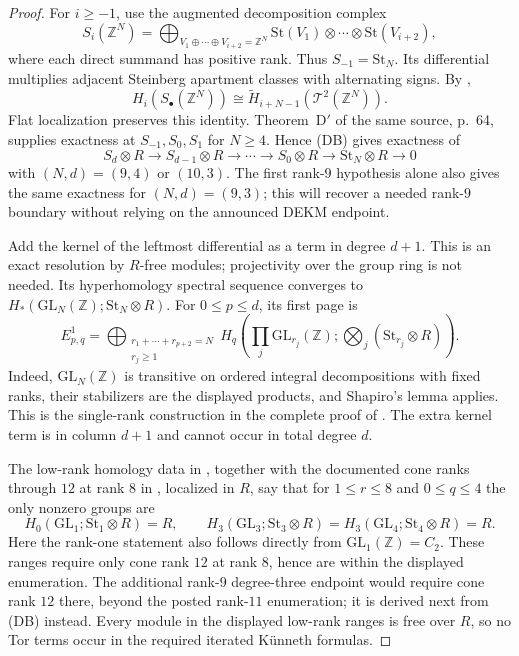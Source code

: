 \documentclass[11pt,a4paper]{article}
\theoremstyle{definition}
\begin{document}
\begin{proof}
For $i\ge-1$, use the augmented decomposition complex
\[
 S_i(\mathbb Z^N)=
 \bigoplus_{V_1\oplus\cdots\oplus V_{i+2}=\mathbb Z^N}
       \mathrm{St}(V_1)\otimes\cdots\otimes\mathrm{St}(V_{i+2}),
\]
where each direct summand has positive rank. Thus $S_{-1}=\mathrm{St}_N$.
Its differential multiplies adjacent Steinberg apartment classes with
alternating signs. By \cite[Theorem~23.3, p.~49]{MillerPatztPutman2025},
\[
 H_i(S_\bullet(\mathbb Z^N))
   \cong\widetilde H_{i+N-1}(\mathcal T^2(\mathbb Z^N)).
\]
Flat localization preserves this identity.
Theorem~D$'$ of the same source, p.~64, supplies exactness at
$S_{-1},S_0,S_1$ for $N\ge4$. Hence \textup{(DB)} gives exactness
of
\[
 S_d\otimes R\longrightarrow S_{d-1}\otimes R\longrightarrow\cdots
 \longrightarrow S_0\otimes R\longrightarrow\mathrm{St}_N\otimes R
 \longrightarrow0
\]
with $(N,d)=(9,4)$ or $(10,3)$.
The first rank-$9$ hypothesis alone also gives the same exactness
for $(N,d)=(9,3)$; this will recover a needed rank-$9$ boundary
without relying on the announced DEKM endpoint.

Add the kernel of the leftmost differential as a term in degree
$d+1$. This is an exact resolution by $R$-free modules; projectivity
over the group ring is not needed. Its hyperhomology spectral sequence
converges to $H_*(\mathrm{GL}_N(\mathbb Z);\mathrm{St}_N\otimes R)$.
For $0\le p\le d$, its first page is
\[
 E^1_{p,q}=
 \bigoplus_{\substack{r_1+\cdots+r_{p+2}=N\\r_j\ge1}}
 H_q\left(\prod_j\mathrm{GL}_{r_j}(\mathbb Z);
                   \bigotimes_j(\mathrm{St}_{r_j}\otimes R)\right).
                                                               \tag{DB1}
\]
Indeed, $\mathrm{GL}_N(\mathbb Z)$ is transitive on ordered integral
decompositions with fixed ranks, their stabilizers are the displayed
products, and Shapiro's lemma applies. This is the single-rank
construction in the complete proof of
\cite[Lemma~23.5, pp.~50--51]{MillerPatztPutman2025}.
The extra kernel term is in column $d+1$ and cannot occur in total
degree $d$.

The low-rank homology data in
\cite[Theorems~4.3 and~8.1]{ElbazGanglSoule2013}, together with
the documented cone ranks through $12$ at rank $8$ in
\cite[Proposition~1.5, Tables~3--5]{DEKM2026}, localized in $R$, say
that for $1\le r\le8$ and $0\le q\le4$ the only nonzero groups
are
\[
 H_0(\mathrm{GL}_1;\mathrm{St}_1\otimes R)=R,
 \qquad
 H_3(\mathrm{GL}_3;\mathrm{St}_3\otimes R)=
 H_3(\mathrm{GL}_4;\mathrm{St}_4\otimes R)=R.
\]
Here the rank-one statement also follows directly from
$\mathrm{GL}_1(\mathbb Z)=C_2$. These ranges require only cone
rank $12$ at rank $8$, hence are within the displayed enumeration.
The additional rank-$9$ degree-three endpoint would require cone
rank $12$ there, beyond the posted rank-$11$ enumeration; it is
derived next from \textup{(DB)} instead. Every module in the
displayed low-rank ranges is free over $R$, so no Tor terms occur
in the required iterated K\"unneth formulas.


\end{proof}
\end{document}
